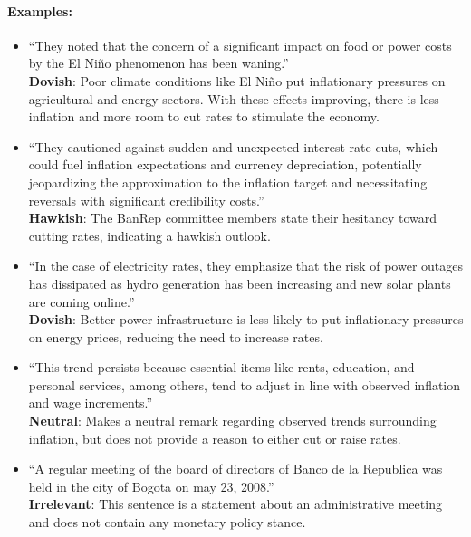 \paragraph{Examples: }
\begin{itemize}
    \item ``They noted that the concern of a significant impact on food or power costs by the El Ni\~no phenomenon has been waning.''\\
    \textbf{Dovish}: Poor climate conditions like El Ni\~no put inflationary pressures on agricultural and energy sectors. With these effects improving, there is less inflation and more room to cut rates to stimulate the economy.
    
    \item ``They cautioned against sudden and unexpected interest rate cuts, which could fuel inflation expectations and currency depreciation, potentially jeopardizing the approximation to the inflation target and necessitating reversals with significant credibility costs.''\\
    \textbf{Hawkish}: The BanRep committee members state their hesitancy toward cutting rates, indicating a hawkish outlook.
    
    \item ``In the case of electricity rates, they emphasize that the risk of power outages has dissipated as hydro generation has been increasing and new solar plants are coming online.'' \\
    \textbf{Dovish}: Better power infrastructure is less likely to put inflationary pressures on energy prices, reducing the need to increase rates.

    \item ``This trend persists because essential items like rents, education, and personal services, among others, tend to adjust in line with observed inflation and wage increments.'' \\
    \textbf{Neutral}: Makes a neutral remark regarding observed trends surrounding inflation, but does not provide a reason to either cut or raise rates.

    \item ``A regular meeting of the board of directors of Banco de la Republica was held in the city of Bogota on may 23, 2008.''\\
    \textbf{Irrelevant}: This sentence is a statement about an administrative meeting and does not contain any monetary policy stance.
\end{itemize}

